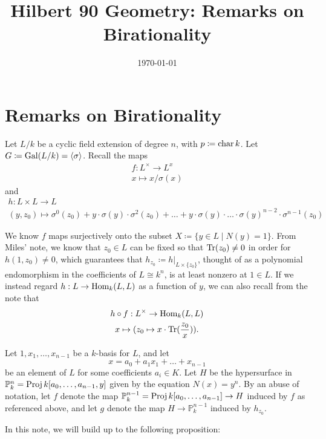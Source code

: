 \documentclass[letterpaper, openany, 10pt]{article}
\title{Hilbert 90 Geometry: Remarks on Birationality}
\author{}
\date{\today}
\begin{document}
\maketitle

\section{Remarks on Birationality}

Let $L/k$ be a cyclic field extension of degree $n$, with $p \coloneqq \operatorname{char} k$. Let $G \coloneqq \operatorname{Gal}(L/k) = \left\langle \sigma \right\rangle$. Recall the maps
\begin{gather*}
	f: L^\times \to L^x \\
	x \mapsto x/\sigma(x)
\end{gather*}
and
\begin{gather*}
	h: L \times L \to L \\
	(y, z_0) \mapsto \sigma^0(z_0) + y \cdot \sigma(y) \cdot \sigma^2(z_0) + \ldots + y \cdot \sigma(y) \cdot \ldots \cdot \sigma(y)^{n-2} \cdot \sigma^{n-1}(z_0)
\end{gather*}

We know $f$ maps surjectively onto the subset $X \coloneqq \{y \in L \mid N(y) = 1\}$. From Miles' note, we know that $z_0 \in L$ can be fixed so that $\operatorname{Tr}(z_0) \neq 0$ in order for $h(1, z_0) \neq 0$, which guarantees that $h_{z_0} \coloneqq h|_{L \times \{z_0\}}$, thought of as a polynomial endomorphism in the coefficients of $L \cong k^n$, is at least nonzero at $1 \in L$. If we instead regard $h: L \to \operatorname{Hom}_k(L, L)$ as a function of $y$, we can also recall from the note that
\begin{gather*}
	h \circ f: L^\times \to \operatorname{Hom}_k(L, L) \\
	x \mapsto (z_0 \mapsto x \cdot \operatorname{Tr}(\frac{z_0}{x})).
\end{gather*}

Let $1, x_1, \ldots, x_{n-1}$ be a $k$-basis for $L$, and let
\[
	x = a_0 + a_1x_1 + \ldots + x_{n-1}
\]
be an element of $L$ for some coefficients $a_i \in K$. Let $H$ be the hypersurface in $\mathbb{P}_k^n = \operatorname{Proj} k[a_0, \ldots, a_{n-1}, y]$ given by the equation $N(x) = y^n$. By an abuse of notation, let $f$ denote the map $\mathbb{P}_k^{n-1} = \operatorname{Proj} k[a_0, \ldots, a_{n-1}] \to H$ induced by $f$ as referenced above, and let $g$ denote the map $H \to \mathbb{P}_k^{n-1}$ induced by $h_{z_0}$.

In this note, we will build up to the following proposition:
\end{document}
